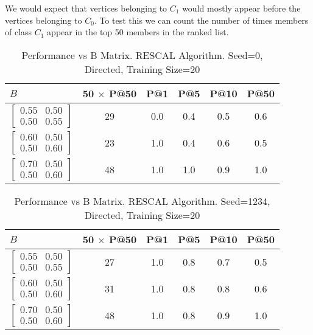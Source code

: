 \documentclass{tufte-handout}
\begin{document}
We would expect that vertices belonging to $C_1$ would mostly appear before the
vertices belonging to $C_0$. To test this we can count the number of times
members of class $C_1$ appear in the top 50 members in the ranked list.
\pagebreak
\begin{table}[htbp]
  \begin{tabular}{l c c c c c}
    $B$ & 50 $\times$ P@50 & P@1 & P@5 & P@10 & P@50 \\ \toprule
  $\begin{bmatrix} 0.55 & 0.50 \\0.50 &0.55 \end{bmatrix}$ & 29 & 0.0 & 0.4 & 0.5 & 0.6 \\
  $\begin{bmatrix} 0.60 & 0.50 \\0.50 &0.60 \end{bmatrix}$ & 23 & 1.0 & 0.4 & 0.6 & 0.5 \\
  $\begin{bmatrix} 0.70 & 0.50 \\0.50 &0.60 \end{bmatrix}$ & 48 & 1.0 & 1.0 & 0.9 & 1.0 \\
  \end{tabular}
  \caption{Performance vs B Matrix. RESCAL Algorithm. Seed=0, Directed, Training Size=20}
  \label{tab:perf-vs-b}
\end{table}

\begin{table}[htbp]
  \begin{tabular}{l c c c c c}
    $B$ & 50 $\times$ P@50 & P@1 & P@5 & P@10 & P@50 \\ \toprule
  $\begin{bmatrix} 0.55 & 0.50 \\0.50 &0.55 \end{bmatrix}$ & 27 & 1.0 & 0.8 & 0.7 & 0.5 \\
  $\begin{bmatrix} 0.60 & 0.50 \\0.50 &0.60 \end{bmatrix}$ & 31 & 1.0 & 0.8 & 0.8 & 0.6 \\
  $\begin{bmatrix} 0.70 & 0.50 \\0.50 &0.60 \end{bmatrix}$ & 48 & 1.0 & 0.8 & 0.9 & 1.0 \\
  \end{tabular}
  \caption{Performance vs B Matrix. RESCAL Algorithm. Seed=1234, Directed, Training Size=20}
  \label{tab:perf-vs-b}
\end{table}
\end{document}

